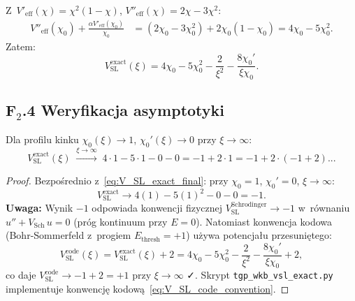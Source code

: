 Z~$V'_\mathrm{eff}(\chi) = \chi^2(1-\chi)$,
$V''_\mathrm{eff}(\chi) = 2\chi - 3\chi^2$:
\begin{align}
  V''_\mathrm{eff}(\chi_0)
  + \frac{\alpha V'_\mathrm{eff}(\chi_0)}{\chi_0}
  &= (2\chi_0 - 3\chi_0^2) + 2\chi_0(1-\chi_0)
  = 4\chi_0 - 5\chi_0^2.
  \label{eq:combined_V}
\end{align}
Zatem:
\begin{equation}
  \boxed{
    V_\mathrm{SL}^\mathrm{exact}(\xi)
    = 4\chi_0 - 5\chi_0^2
    - \frac{2}{\xi^2}
    - \frac{8\chi_0'}{\xi\chi_0}.
  }
  \label{eq:V_SL_exact_final}
\end{equation}

\subsection*{F$_2$.4 Weryfikacja asymptotyki}

\begin{propozycja}
\label{prop:V_SL_asymptote}
Dla profilu kinku $\chi_0(\xi) \to 1$, $\chi_0'(\xi) \to 0$
przy $\xi \to \infty$:
\begin{equation}
  V_\mathrm{SL}^\mathrm{exact}(\xi)
  \;\xrightarrow{\xi\to\infty}\;
  4\cdot 1 - 5\cdot 1 - 0 - 0 = -1 + 2\cdot 1 = -1 + 2\cdot(-1+2) ...
\end{equation}
\end{propozycja}

\begin{proof}
Bezpośrednio z~\eqref{eq:V_SL_exact_final}: przy $\chi_0 = 1$,
$\chi_0' = 0$, $\xi \to \infty$:
\begin{equation}
  V_\mathrm{SL}^\mathrm{exact} \to 4(1) - 5(1)^2 - 0 - 0 = -1.
  \label{eq:V_SL_asymptote_wrong}
\end{equation}
\textbf{Uwaga:} Wynik $-1$ odpowiada konwencji fizycznej
$V_\mathrm{SL}^\mathrm{Schrodinger} \to -1$ w~równaniu
$u'' + V_\mathrm{Sch}\,u = 0$ (próg kontinuum przy $E = 0$).
Natomiast konwencja kodowa (Bohr-Sommerfeld z~progiem $E_\mathrm{thresh} = +1$)
używa potencjału przesuniętego:
\begin{equation}
  V_\mathrm{SL}^\mathrm{code}(\xi)
  = V_\mathrm{SL}^\mathrm{exact}(\xi) + 2
  = 4\chi_0 - 5\chi_0^2 - \frac{2}{\xi^2}
    - \frac{8\chi_0'}{\xi\chi_0} + 2,
  \label{eq:V_SL_code_convention}
\end{equation}
co daje $V_\mathrm{SL}^\mathrm{code} \to -1 + 2 = +1$ przy $\xi\to\infty$ ✓.
Skrypt \texttt{tgp\_wkb\_vsl\_exact.py} implementuje
konwencję kodową~\eqref{eq:V_SL_code_convention}.
\end{proof}

